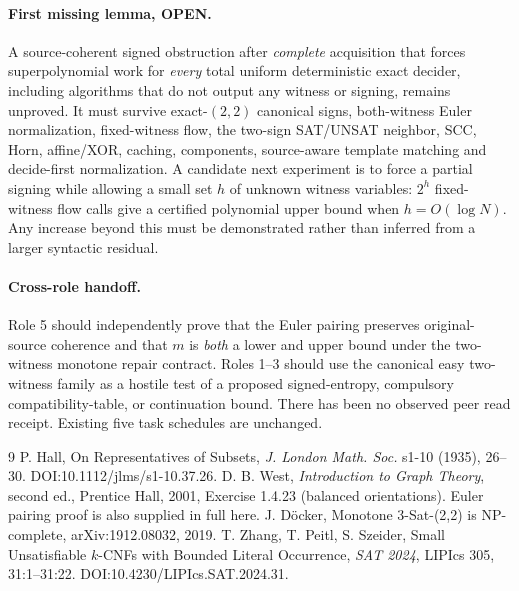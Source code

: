 \documentclass[11pt]{article}
\begin{document}
\paragraph{First missing lemma, OPEN.}
A source-coherent signed obstruction after \emph{complete} acquisition that forces superpolynomial work for \emph{every} total uniform deterministic exact decider, including algorithms that do not output any witness or signing, remains unproved. It must survive exact-$(2,2)$ canonical signs, both-witness Euler normalization, fixed-witness flow, the two-sign SAT/UNSAT neighbor, SCC, Horn, affine/XOR, caching, components, source-aware template matching and decide-first normalization. A candidate next experiment is to force a partial signing while allowing a small set \(h\) of unknown witness variables: \(2^h\) fixed-witness flow calls give a certified polynomial upper bound when \(h=O(\log N)\). Any increase beyond this must be demonstrated rather than inferred from a larger syntactic residual.

\paragraph{Cross-role handoff.}
Role 5 should independently prove that the Euler pairing preserves original-source coherence and that \(m\) is \emph{both} a lower and upper bound under the two-witness monotone repair contract. Roles 1--3 should use the canonical easy two-witness family as a hostile test of a proposed signed-entropy, compulsory compatibility-table, or continuation bound. There has been no observed peer read receipt. Existing five task schedules are unchanged.

\begin{thebibliography}{9}
 P. Hall, On Representatives of Subsets, \emph{J. London Math. Soc.} s1-10 (1935), 26--30. DOI:10.1112/jlms/s1-10.37.26.
 D. B. West, \emph{Introduction to Graph Theory}, second ed., Prentice Hall, 2001, Exercise 1.4.23 (balanced orientations). Euler pairing proof is also supplied in full here.
 J. D\"ocker, Monotone 3-Sat-(2,2) is NP-complete, arXiv:1912.08032, 2019.
 T. Zhang, T. Peitl, S. Szeider, Small Unsatisfiable \(k\)-CNFs with Bounded Literal Occurrence, \emph{SAT 2024}, LIPIcs 305, 31:1--31:22. DOI:10.4230/LIPIcs.SAT.2024.31.
\end{thebibliography}
\end{document}
